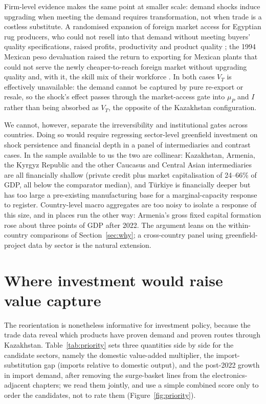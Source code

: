\documentclass[12pt]{article}
\begin{document}
Firm-level evidence makes the same point at smaller scale: demand shocks induce upgrading
when meeting the demand requires transformation, not when trade is a costless substitute.
A randomised expansion of foreign market access for Egyptian rug producers, who could not
resell into that demand without meeting buyers' quality specifications, raised
profits, productivity and product quality \citep{atkinkhandelwalosman2017}; the 1994 Mexican
peso devaluation raised the return to exporting for Mexican plants that could not serve the
newly cheaper-to-reach foreign market without upgrading quality and, with it, the skill mix
of their workforce \citep{verhoogen2008}. In both cases $V_T$ is effectively unavailable: the demand cannot be captured by pure re-export or resale, so the shock's effect passes
through the market-access gate into $\mu_P$ and $I$ rather than being absorbed as $V_T$, the
opposite of the Kazakhstan configuration.

We cannot, however, separate the irreversibility and institutional
gates across countries. Doing so would require regressing sector-level greenfield investment on
shock persistence and financial depth in a panel of intermediaries and contrast cases. In the sample available
to us the two are collinear: Kazakhstan, Armenia, the Kyrgyz Republic and the other Caucasus
and Central Asian intermediaries are all financially shallow (private credit plus market
capitalisation of 24--66\% of GDP, all below the comparator median), and T\"urkiye is
financially deeper but has too large a pre-existing manufacturing base for a marginal-capacity
response to register. Country-level macro aggregates are too noisy to isolate a
response of this size, and in places run the other way:
Armenia's gross fixed capital formation rose about three points of GDP after 2022.
The argument leans on the within-country comparisons of Section~\ref{sec:why}; a
cross-country panel using greenfield-project data by sector is the natural extension.

\section{Where investment would raise value capture}\label{sec:where}

The reorientation is nonetheless informative for investment policy, because the trade data
reveal which products have proven demand and proven routes through Kazakhstan. Table~\ref{tab:priority}
sets three quantities side by side for the candidate sectors, namely the domestic value-added
multiplier, the import-substitution gap (imports relative to domestic output), and the
post-2022 growth in import demand, after removing the surge-basket lines from the
electronics-adjacent chapters; we read them jointly, and use a simple combined score only to
order the candidates, not to rate them (Figure~\ref{fig:priority}).
\end{document}
